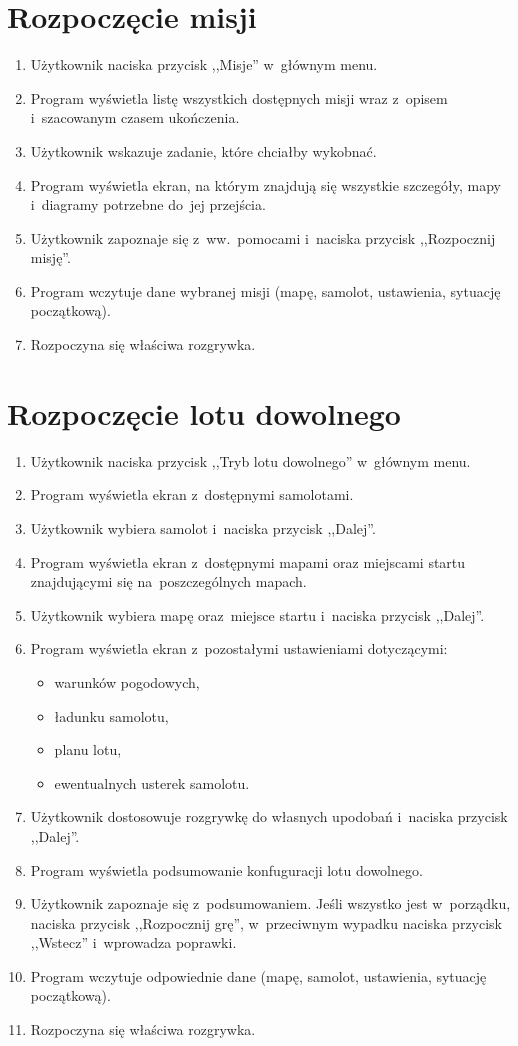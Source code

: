\documentclass{mwrep}
\begin{document}
\section{Rozpoczęcie misji}
\begin{enumerate}
  \item Użytkownik naciska przycisk ,,Misje'' w~głównym menu.
  \item Program wyświetla listę wszystkich dostępnych misji wraz z~opisem i~szacowanym czasem ukończenia.
  \item Użytkownik wskazuje zadanie, które chciałby wykobnać.
  \item Program wyświetla ekran, na którym znajdują się wszystkie szczegóły, mapy i~diagramy potrzebne do~jej przejścia.
  \item Użytkownik zapoznaje się z~ww.~pomocami i~naciska przycisk ,,Rozpocznij misję''.
  \item Program wczytuje dane wybranej misji (mapę, samolot, ustawienia, sytuację początkową).
  \item Rozpoczyna się właściwa rozgrywka.
\end{enumerate}

\section{Rozpoczęcie lotu dowolnego}
\begin{enumerate}
  \item Użytkownik naciska przycisk ,,Tryb lotu dowolnego'' w~głównym menu.
  \item Program wyświetla ekran z~dostępnymi samolotami.
  \item Użytkownik wybiera samolot i~naciska przycisk ,,Dalej''.
  \item Program wyświetla ekran z~dostępnymi mapami oraz miejscami startu znajdującymi się na~poszczególnych mapach.
  \item Użytkownik wybiera mapę oraz~miejsce startu i~naciska przycisk ,,Dalej''.
  \item Program wyświetla ekran z~pozostałymi ustawieniami dotyczącymi:
  \begin{itemize}
    \item warunków pogodowych,
    \item ładunku samolotu,
    \item planu lotu,
    \item ewentualnych usterek samolotu.
  \end{itemize}
  \item Użytkownik dostosowuje rozgrywkę do własnych upodobań i~naciska przycisk ,,Dalej''.
  \item Program wyświetla podsumowanie konfuguracji lotu dowolnego.
  \item Użytkownik zapoznaje się z~podsumowaniem. Jeśli wszystko jest w~porządku, naciska przycisk ,,Rozpocznij grę'', w~przeciwnym wypadku naciska przycisk ,,Wstecz'' i~wprowadza poprawki.
  \item Program wczytuje odpowiednie dane (mapę, samolot, ustawienia, sytuację początkową).
  \item Rozpoczyna się właściwa rozgrywka.
\end{enumerate}
\end{document}
